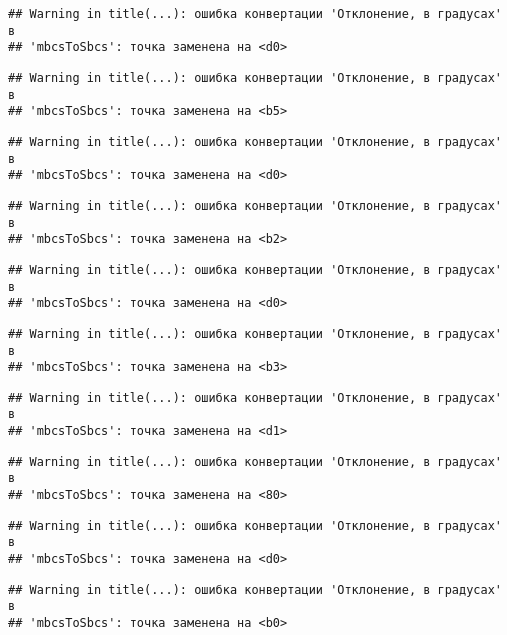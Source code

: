 \documentclass[
]{article}
\begin{document}
\begin{verbatim}
## Warning in title(...): ошибка конвертации 'Отклонение, в градусах' в
## 'mbcsToSbcs': точка заменена на <d0>
\end{verbatim}

\begin{verbatim}
## Warning in title(...): ошибка конвертации 'Отклонение, в градусах' в
## 'mbcsToSbcs': точка заменена на <b5>
\end{verbatim}

\begin{verbatim}
## Warning in title(...): ошибка конвертации 'Отклонение, в градусах' в
## 'mbcsToSbcs': точка заменена на <d0>
\end{verbatim}

\begin{verbatim}
## Warning in title(...): ошибка конвертации 'Отклонение, в градусах' в
## 'mbcsToSbcs': точка заменена на <b2>
\end{verbatim}

\begin{verbatim}
## Warning in title(...): ошибка конвертации 'Отклонение, в градусах' в
## 'mbcsToSbcs': точка заменена на <d0>
\end{verbatim}

\begin{verbatim}
## Warning in title(...): ошибка конвертации 'Отклонение, в градусах' в
## 'mbcsToSbcs': точка заменена на <b3>
\end{verbatim}

\begin{verbatim}
## Warning in title(...): ошибка конвертации 'Отклонение, в градусах' в
## 'mbcsToSbcs': точка заменена на <d1>
\end{verbatim}

\begin{verbatim}
## Warning in title(...): ошибка конвертации 'Отклонение, в градусах' в
## 'mbcsToSbcs': точка заменена на <80>
\end{verbatim}

\begin{verbatim}
## Warning in title(...): ошибка конвертации 'Отклонение, в градусах' в
## 'mbcsToSbcs': точка заменена на <d0>
\end{verbatim}

\begin{verbatim}
## Warning in title(...): ошибка конвертации 'Отклонение, в градусах' в
## 'mbcsToSbcs': точка заменена на <b0>
\end{verbatim}
\end{document}
